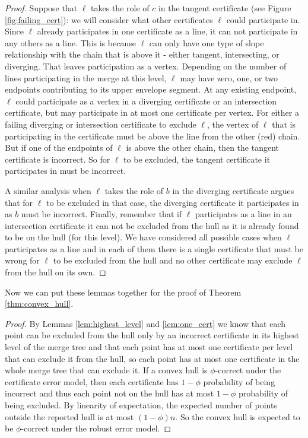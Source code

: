 \documentclass[11pt]{article}
\begin{document}
\begin{proof}
   Suppose that $\ell$ takes the role of $c$ in the tangent certificate (see Figure \ref{fig:failing_cert}): we will consider what other certificates $\ell$ could participate in.  Since $\ell$ already participates in one certificate as a line, it can not participate in any others as a line.  This is because $\ell$ can only have one type of slope relationship with the chain that is above it - either tangent, intersecting, or diverging.
That leaves participation as a vertex.  Depending on the number of lines participating in the merge at this level, $\ell$ may have zero, one, or two endpoints contributing to its upper envelope segment. 
At any existing endpoint, $\ell$ could participate as a vertex in a diverging certificate or an intersection certificate, but may participate in at most one certificate per vertex.  For either a failing diverging or intersection certificate to exclude $\ell$, the vertex of $\ell$ that is participating in the certificate must be above the line from the other (red) chain.  But if one of the endpoints of $\ell$ is above the other chain, then the tangent certificate is incorrect.  So for $\ell$ to be excluded, the tangent certificate it participates in must be incorrect.

A similar analysis when $\ell$ takes the role of $b$ in the diverging certificate argues that for $\ell$ to be excluded in that case, the diverging certificate it participates in as $b$ must be incorrect.  Finally, remember that if $\ell$ participates as a line in an intersection certificate it can not be excluded from the hull as it is already found to be on the hull (for this level).  We have considered all possible cases when $\ell$ participates as a line and in each of them there is a single certificate that must be wrong for $\ell$ to be excluded from the hull and no other certificate may exclude $\ell$ from the hull on its own.
\end{proof}

Now we can put these lemmas together for the proof of Theorem \ref{thm:convex_hull}.

\begin{proof}
By Lemmas \ref{lem:highest_level} and \ref{lem:one_cert} we know that each point can be excluded from the hull only by an incorrect certificate in its highest level of the merge tree and that each point has at most one certificate per level that can exclude it from the hull, so each point has at most one certificate in the whole merge tree that can exclude it.  If a convex hull is $\phi$-correct under the certificate error model, then each certificate has $1 - \phi$ probability of being incorrect and thus each point not on the hull has at most $1 - \phi$ probability of being excluded.  
By linearity of expectation, the expected number of points outside the reported hull is at most $(1 - \phi) n$.  So the convex hull is expected to be $\phi$-correct under the robust error model.
\end{proof}
\end{document}
